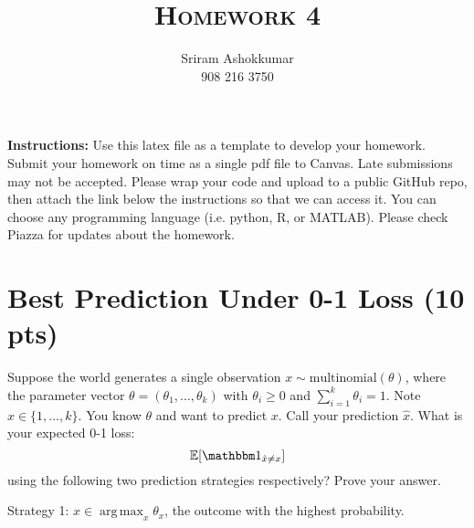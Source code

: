 \documentclass[a4paper]{article}
\title{\textsc{Homework 4}} %
\author{
Sriram Ashokkumar\\
908 216 3750\\
}
\date{}
\theoremstyle{definition}
\DeclareMathOperator*{\argmax}{arg\,max}
\def\E{\mathbb E}
\def\ind{\mathbbm 1}
\begin{document}
\maketitle 


\textbf{Instructions:} Use this latex file as a template to develop your homework. Submit your homework on time as a single pdf file to Canvas. Late submissions may not be accepted. Please wrap your code and upload to a public GitHub repo, then attach the link below the instructions so that we can access it. You can choose any programming language (i.e. python, R, or MATLAB). Please check Piazza for updates about the homework.

\section{Best Prediction Under 0-1 Loss (10 pts)}
Suppose the world generates a single observation $x \sim \mbox{multinomial}(\theta)$, where the parameter vector $\theta=(\theta_1, \ldots, \theta_k)$ with $\theta_i\ge 0$ and $\sum_{i=1}^k \theta_i=1$.  Note $x \in \{1, \ldots, k\}$.
You know $\theta$ and want to predict $x$. 
Call your prediction $\hat x$.  What is your expected 0-1 loss: 
$$\E[\ind_{\hat x \neq x}]$$
using the following two prediction strategies respectively?  Prove your answer.


Strategy 1: $\hat x \in \argmax_x \theta_x$, the outcome with the highest probability.
\end{document}
